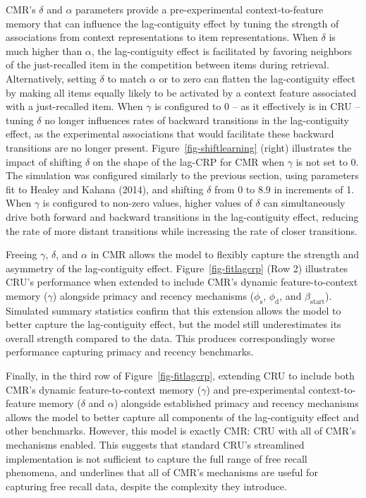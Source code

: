 \documentclass[
  letterpaper,
  11pt,
  english,
  singlespacing,
  headsepline]{MastersDoctoralThesis}
\begin{document}
CMR's \(\delta\) and \(\alpha\) parameters provide a pre-experimental
context-to-feature memory that can influence the lag-contiguity effect
by tuning the strength of associations from context representations to
item representations. When \(\delta\) is much higher than \(\alpha\),
the lag-contiguity effect is facilitated by favoring neighbors of the
just-recalled item in the competition between items during retrieval.
Alternatively, setting \(\delta\) to match \(\alpha\) or to zero can
flatten the lag-contiguity effect by making all items equally likely to
be activated by a context feature associated with a just-recalled item.
When \(\gamma\) is configured to 0 -- as it effectively is in CRU --
tuning \(\delta\) no longer influences rates of backward transitions in
the lag-contiguity effect, as the experimental associations that would
facilitate these backward transitions are no longer present.
Figure~\ref{fig-shiftlearning} (right) illustrates the impact of
shifting \(\delta\) on the shape of the lag-CRP for CMR when \(\gamma\)
is not set to 0. The simulation was configured similarly to the previous
section, using parameters fit to Healey and Kahana (2014), and shifting
\(\delta\) from 0 to 8.9 in increments of 1. When \(\gamma\) is
configured to non-zero values, higher values of \(\delta\) can
simultaneously drive both forward and backward transitions in the
lag-contiguity effect, reducing the rate of more distant transitions
while increasing the rate of closer transitions.

Freeing \(\gamma\), \(\delta\), and \(\alpha\) in CMR allows the model
to flexibly capture the strength and asymmetry of the lag-contiguity
effect. Figure~\ref{fig-fitlagcrp} (Row 2) illustrates CRU's performance
when extended to include CMR's dynamic feature-to-context memory
(\(\gamma\)) alongside primacy and recency mechanisms
(\(\phi_\text{s}\), \(\phi_\text{d}\), and \(\beta_\text{start}\)).
Simulated summary statistics confirm that this extension allows the
model to better capture the lag-contiguity effect, but the model still
underestimates its overall strength compared to the data. This produces
correspondingly worse performance capturing primacy and recency
benchmarks.

Finally, in the third row of Figure~\ref{fig-fitlagcrp}, extending CRU
to include both CMR's dynamic feature-to-context memory (\(\gamma\)) and
pre-experimental context-to-feature memory (\(\delta\) and \(\alpha\))
alongside established primacy and recency mechanisms allows the model to
better capture all components of the lag-contiguity effect and other
benchmarks. However, this model is exactly CMR: CRU with all of CMR's
mechanisms enabled. This suggests that standard CRU's streamlined
implementation is not sufficient to capture the full range of free
recall phenomena, and underlines that all of CMR's mechanisms are useful
for capturing free recall data, despite the complexity they introduce.
\end{document}
